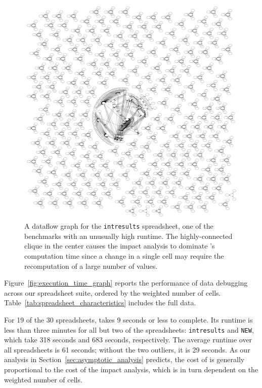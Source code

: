 \begin{figure}[!t]
\centering
\includegraphics[width=7in]{intresults_tree}
  \caption{A dataflow graph for the \texttt{intresults} spreadsheet, one of the benchmarks with an unusually high runtime.  The highly-connected clique in the center causes the impact analysis to dominate \checkcell{}'s computation time since a change in a single cell may require the recomputation of a large number of values. \label{fig:intresults_tree}}
\end{figure}

 
Figure~\ref{fig:execution_time_graph} reports the performance of data
debugging across our spreadsheet suite, ordered by the weighted number
of cells. Table~\ref{tab:spreadsheet_characteristics} includes the full data.

For 19 of the 30 spreadsheets, \checkcell{} takes 9 seconds or less to
complete. Its runtime is less than three minutes for all but two of
the spreadsheets: \texttt{intresults} and \texttt{NEW}, which take 318
seconds and 683 seconds, respectively. The average runtime over all
spreadsheets is 61 seconds; without the two outliers, it is 29
seconds. As our analysis in Section~\ref{sec:asymptotic_analysis}
predicts, the cost of \checkcell{} is generally proportional to the
cost of the impact analysis, which is in turn dependent on the
weighted number of cells.

